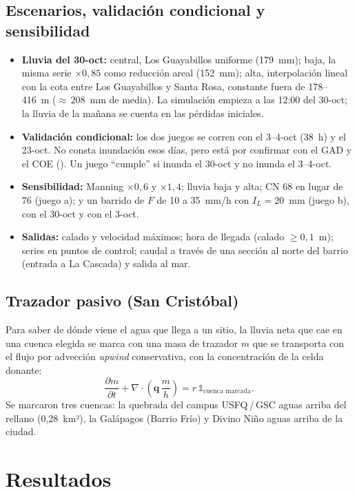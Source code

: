 \documentclass{sosg-informe}
\begin{document}
\subsection{Escenarios, validación condicional y sensibilidad}
\begin{itemize}
  \item \textbf{Lluvia del 30-oct:} central, Los Guayabillos uniforme (179~mm); baja, la misma serie $\times 0,85$ como reducción areal (152~mm); alta, interpolación lineal con la cota entre Los Guayabillos y Santa Rosa, constante fuera de 178--416~m (${\approx}\,208$~mm de media). La simulación empieza a las 12:00 del 30-oct; la lluvia de la mañana se cuenta en las pérdidas iniciales.
  \item \textbf{Validación condicional:} los dos juegos se corren con el 3--4-oct (38~h) y el 23-oct. No consta inundación esos días, pero está por confirmar con el GAD y el COE (). Un juego \enquote{cumple} si inunda el 30-oct y no inunda el 3--4-oct.
  \item \textbf{Sensibilidad:} Manning $\times 0,6$ y $\times 1,4$; lluvia baja y alta; CN 68 en lugar de 76 (juego a); y un barrido de $F$ de 10 a 35~mm/h con $I_L = 20$~mm (juego b), con el 30-oct y con el 3-oct.
  \item \textbf{Salidas:} calado y velocidad máximos; hora de llegada (calado $\geq 0,1$~m); series en puntos de control; caudal a través de una sección al norte del barrio (entrada a La Cascada) y salida al mar.
\end{itemize}

\subsection{Trazador pasivo (San Cristóbal)}
Para saber de dónde viene el agua que llega a un sitio, la lluvia neta que cae en una cuenca elegida se marca con una masa de trazador $m$ que se transporta con el flujo por advección \emph{upwind} conservativa, con la concentración de la celda donante:
\begin{equation}
  \frac{\partial m}{\partial t} + \nabla\!\cdot\!\left(\mathbf{q}\,\frac{m}{h}\right) = r\,\mathbb{1}_{\text{cuenca marcada}} .
\end{equation}
Se marcaron tres cuencas: la quebrada del campus USFQ\,/\,GSC aguas arriba del rellano (0,28~km²), la Galápagos (Barrio Frío) y Divino Niño aguas arriba de la ciudad.

\section{Resultados}
\end{document}
